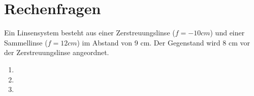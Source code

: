 \documentclass[12pt,a4paper,ngerman]{article}
\begin{document}
\pagebreak
\section*{Rechenfragen}


\begin{framed}
Ein Linsensystem besteht aus einer Zerstreuungslinse ($f=-10cm$) und einer Sammellinse ($f=12cm$) im Abstand von 9 cm. Der Gegenstand wird 8 cm vor der Zerstreuungslinse angeordnet.
\begin{enumerate}
\item
\item
\item
\end{enumerate}
\end{framed}


















 



   
\end{document}

